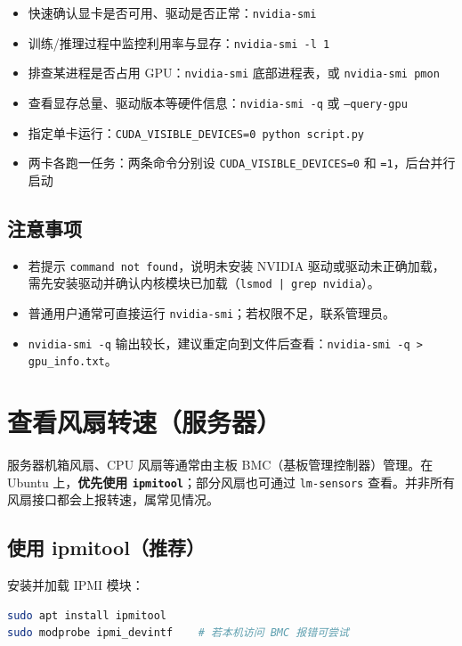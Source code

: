 \begin{itemize}
    \item 快速确认显卡是否可用、驱动是否正常：\texttt{nvidia-smi}
    \item 训练/推理过程中监控利用率与显存：\texttt{nvidia-smi -l 1}
    \item 排查某进程是否占用 GPU：\texttt{nvidia-smi} 底部进程表，或 \texttt{nvidia-smi pmon}
    \item 查看显存总量、驱动版本等硬件信息：\texttt{nvidia-smi -q} 或 \texttt{--query-gpu}
    \item 指定单卡运行：\texttt{CUDA\_VISIBLE\_DEVICES=0 python script.py}
    \item 两卡各跑一任务：两条命令分别设 \texttt{CUDA\_VISIBLE\_DEVICES=0} 和 \texttt{=1}，后台并行启动
\end{itemize}

\subsection{注意事项}

\begin{itemize}
    \item 若提示 \texttt{command not found}，说明未安装 NVIDIA 驱动或驱动未正确加载，需先安装驱动并确认内核模块已加载（\texttt{lsmod | grep nvidia}）。
    \item 普通用户通常可直接运行 \texttt{nvidia-smi}；若权限不足，联系管理员。
    \item \texttt{nvidia-smi -q} 输出较长，建议重定向到文件后查看：\texttt{nvidia-smi -q > gpu\_info.txt}。
\end{itemize}

\section{查看风扇转速（服务器）}

服务器机箱风扇、CPU 风扇等通常由主板 BMC（基板管理控制器）管理。在 Ubuntu 上，\textbf{优先使用 \texttt{ipmitool}}；部分风扇也可通过 \texttt{lm-sensors} 查看。并非所有风扇接口都会上报转速，属常见情况。

\subsection{使用 ipmitool（推荐）}

安装并加载 IPMI 模块：

\begin{lstlisting}[language=sh]
sudo apt install ipmitool
sudo modprobe ipmi_devintf    # 若本机访问 BMC 报错可尝试
\end{lstlisting}

